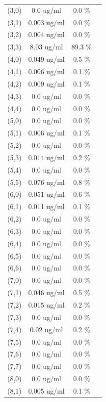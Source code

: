 \documentclass{article}
\begin{document}
\begin{tabular}{c c c c}
(3,0)&        0.0 ug/ml        &0.0 \%\\
(3,1)&        0.003 ug/ml        &0.0 \%\\
(3,2)&        0.004 ug/ml        &0.0 \%\\
(3,3)&        8.03 ug/ml        &89.3 \%\\
(4,0)&        0.049 ug/ml        &0.5 \%\\
(4,1)&        0.006 ug/ml        &0.1 \%\\
(4,2)&        0.009 ug/ml        &0.1 \%\\
(4,3)&        0.0 ug/ml        &0.0 \%\\
(4,4)&        0.0 ug/ml        &0.0 \%\\
(5,0)&        0.0 ug/ml        &0.0 \%\\
(5,1)&        0.006 ug/ml        &0.1 \%\\
(5,2)&        0.0 ug/ml        &0.0 \%\\
(5,3)&        0.014 ug/ml        &0.2 \%\\
(5,4)&        0.0 ug/ml        &0.0 \%\\
(5,5)&        0.076 ug/ml        &0.8 \%\\
(6,0)&        0.051 ug/ml        &0.6 \%\\
(6,1)&        0.011 ug/ml        &0.1 \%\\
(6,2)&        0.0 ug/ml        &0.0 \%\\
(6,3)&        0.0 ug/ml        &0.0 \%\\
(6,4)&        0.0 ug/ml        &0.0 \%\\
(6,5)&        0.0 ug/ml        &0.0 \%\\
(6,6)&        0.0 ug/ml        &0.0 \%\\
(7,0)&        0.0 ug/ml        &0.0 \%\\
(7,1)&        0.046 ug/ml        &0.5 \%\\
(7,2)&        0.015 ug/ml        &0.2 \%\\
(7,3)&        0.0 ug/ml        &0.0 \%\\
(7,4)&        0.02 ug/ml        &0.2 \%\\
(7,5)&        0.0 ug/ml        &0.0 \%\\
(7,6)&        0.0 ug/ml        &0.0 \%\\
(7,7)&        0.0 ug/ml        &0.0 \%\\
(8,0)&        0.0 ug/ml        &0.0 \%\\
(8,1)&        0.005 ug/ml        &0.1 \%\\

\end{tabular}
\end{document}
